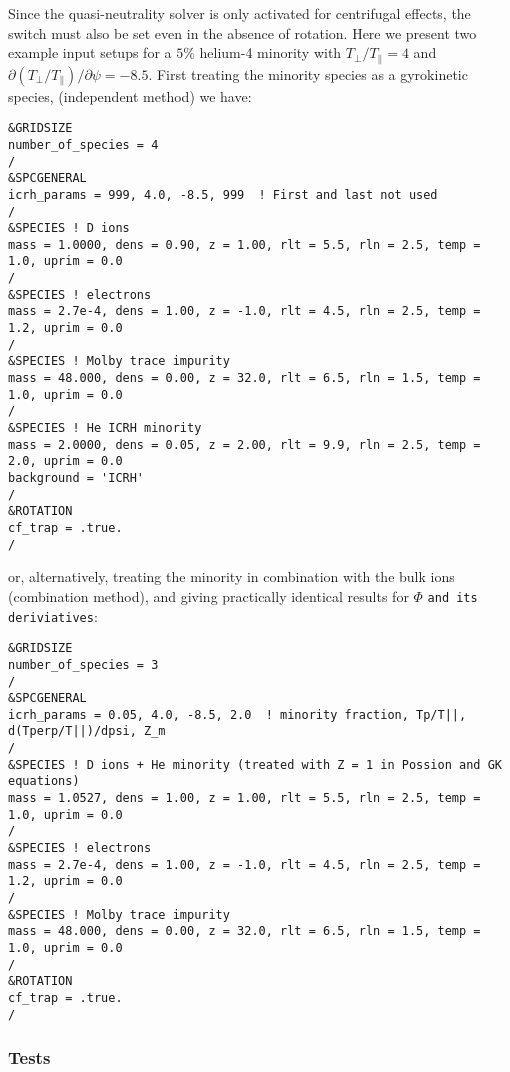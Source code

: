 Since the quasi-neutrality solver is only activated for centrifugal effects, the switch  must also be set
even in the absence of rotation.  Here we present two example input setups for a 
$5\%$ helium-4 minority with $T_\perp/T_\parallel = 4$ and $\partial (T_\perp/T_\parallel) / \partial \psi = -8.5$.
First treating the minority species as a gyrokinetic species, (independent method) we have:
\begin{footnotesize}
\begin{verbatim}
&GRIDSIZE
number_of_species = 4
/
&SPCGENERAL
icrh_params = 999, 4.0, -8.5, 999  ! First and last not used
/
&SPECIES ! D ions
mass = 1.0000, dens = 0.90, z = 1.00, rlt = 5.5, rln = 2.5, temp = 1.0, uprim = 0.0
/
&SPECIES ! electrons
mass = 2.7e-4, dens = 1.00, z = -1.0, rlt = 4.5, rln = 2.5, temp = 1.2, uprim = 0.0
/
&SPECIES ! Molby trace impurity
mass = 48.000, dens = 0.00, z = 32.0, rlt = 6.5, rln = 1.5, temp = 1.0, uprim = 0.0
/
&SPECIES ! He ICRH minority
mass = 2.0000, dens = 0.05, z = 2.00, rlt = 9.9, rln = 2.5, temp = 2.0, uprim = 0.0
background = 'ICRH'
/
&ROTATION
cf_trap = .true.
/
\end{verbatim}
\end{footnotesize}
or, alternatively, treating the minority in combination with the bulk ions (combination method),
and giving practically identical results for $\Phi$ \texttt{and its deriviatives}: 
\begin{footnotesize}
\begin{verbatim}
&GRIDSIZE
number_of_species = 3
/
&SPCGENERAL
icrh_params = 0.05, 4.0, -8.5, 2.0  ! minority fraction, Tp/T||, d(Tperp/T||)/dpsi, Z_m
/
&SPECIES ! D ions + He minority (treated with Z = 1 in Possion and GK equations)
mass = 1.0527, dens = 1.00, z = 1.00, rlt = 5.5, rln = 2.5, temp = 1.0, uprim = 0.0
/
&SPECIES ! electrons
mass = 2.7e-4, dens = 1.00, z = -1.0, rlt = 4.5, rln = 2.5, temp = 1.2, uprim = 0.0
/
&SPECIES ! Molby trace impurity
mass = 48.000, dens = 0.00, z = 32.0, rlt = 6.5, rln = 1.5, temp = 1.0, uprim = 0.0
/
&ROTATION
cf_trap = .true.
/
\end{verbatim}
\end{footnotesize}

\subsubsection{Tests}

